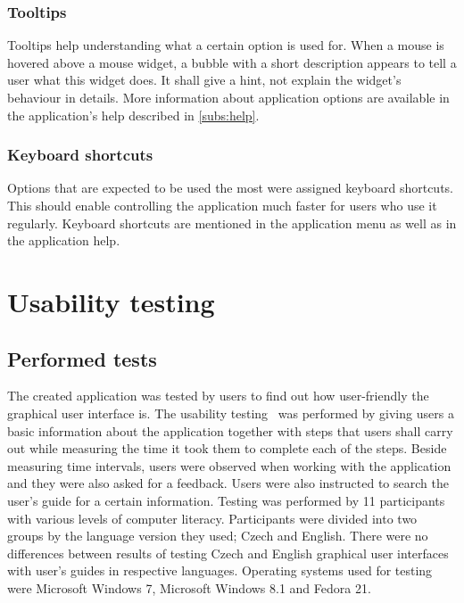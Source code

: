 \subsection{Tooltips}
Tooltips help understanding what a certain option is used for. When a mouse is hovered above a mouse widget, a bubble with a short description appears to tell a user what this widget does. It shall give a hint, not explain the widget's behaviour in details. More information about application options are available in the application's help described in \autoref{subs:help}.

\subsection{Keyboard shortcuts}
Options that are expected to be used the most were assigned keyboard shortcuts. This should enable controlling the application much faster for users who use it regularly. Keyboard shortcuts are mentioned in the application menu as well as in the application help.

\chapter{Usability testing}\label{ch:testing}
\section{Performed tests}
The created application was tested by users to find out how user-friendly the graphical user interface is. The usability testing~\cite{usability_handbook} was performed by giving users a basic information about the application together with steps that users shall carry out while measuring the time it took them to complete each of the steps. Beside measuring time intervals, users were observed when working with the application and they were also asked for a feedback. Users were also instructed to search the user's guide for a certain information. Testing was performed by 11 participants with various levels of computer literacy. Participants were divided into two groups by the language version they used; Czech and English. There were no differences between results of testing Czech and English graphical user interfaces with user's guides in respective languages. Operating systems used for testing were Microsoft Windows 7, Microsoft Windows 8.1 and Fedora 21.

